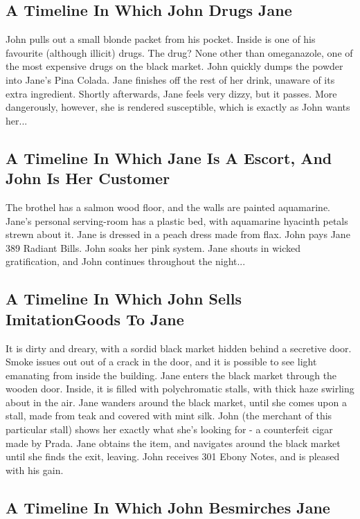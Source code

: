 \documentclass{article}
\begin{document}
\subsection{A Timeline In Which John Drugs Jane}


John pulls out a small blonde packet from his pocket. Inside is one of his favourite (although illicit) drugs.
The drug? None other than omeganazole, one of the most expensive drugs on the black market.
John quickly dumps the powder into Jane's Pina Colada.
Jane finishes off the rest of her drink, unaware of its extra ingredient.
Shortly afterwards, Jane feels very dizzy, but it passes.
More dangerously, however, she is rendered susceptible, which is exactly as John wants her...
\subsection{A Timeline In Which Jane Is A Escort, And John Is Her Customer}


The brothel has a salmon wood floor, and the walls are painted aquamarine.
Jane's personal serving{-}room has a plastic bed, with aquamarine hyacinth petals strewn about it.
Jane is dressed in a peach dress made from flax.
John pays Jane 389 Radiant Bills.
John soaks her pink system.
Jane shouts in wicked gratification, and John continues throughout the night...
\subsection{A Timeline In Which John Sells ImitationGoods To Jane}


It is dirty and dreary, with a sordid black market hidden behind a secretive door.
Smoke issues out out of a crack in the door, and it is possible to see light emanating from inside the building.
Jane enters the black market through the wooden door.
Inside, it is filled with polychromatic stalls, with thick haze swirling about in the air.
Jane wanders around the black market, until she comes upon a stall, made from teak and covered with mint silk.
John (the merchant of this particular stall) shows her exactly what she's looking for {-} a counterfeit cigar made by Prada.
Jane obtains the item, and navigates around the black market until she finds the exit, leaving.
John receives 301 Ebony Notes, and is pleased with his gain.
\subsection{A Timeline In Which John Besmirches Jane}
\end{document}
